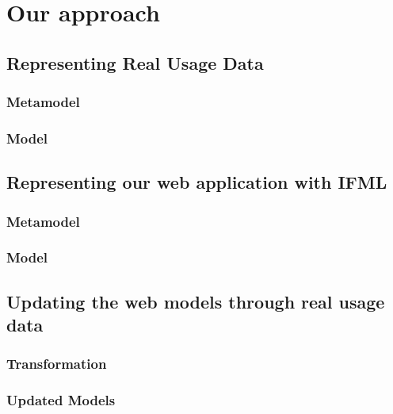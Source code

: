 \chead{}
\chapter{Our approach}


\section{Representing Real Usage Data }

\subsection{Metamodel}

\subsection{Model}

\section{Representing our web application with IFML}

\subsection{Metamodel}

\subsection{Model}

\section{Updating the web models through real usage data}

\subsection{Transformation}

\subsection{Updated Models}
